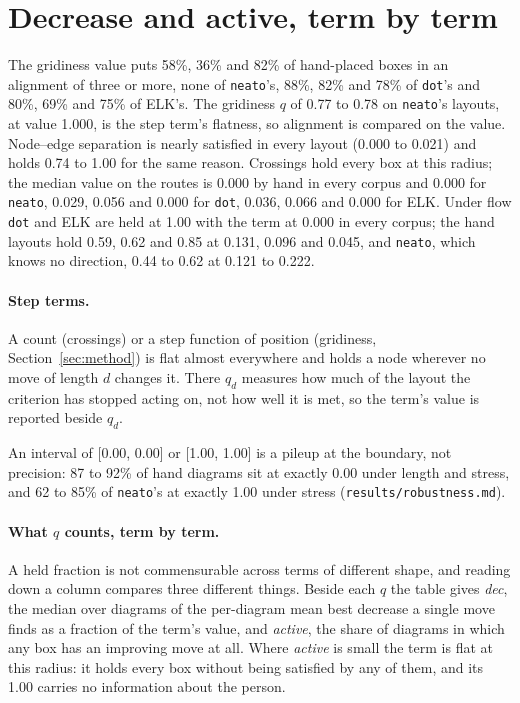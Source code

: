 \documentclass[a4paper,UKenglish]{gd-lipics-v3}
\begin{document}


\section{Decrease and active, term by term}\label{app:flat}

The gridiness value puts 58\%, 36\% and 82\% of hand-placed
boxes in an alignment of three or more, none of \texttt{neato}'s, 88\%, 82\% and 78\% of
\texttt{dot}'s and 80\%, 69\% and 75\% of ELK's. The gridiness $q$ of 0.77 to 0.78 on \texttt{neato}'s layouts, at value
1.000, is the step term's flatness, so alignment is compared on the value.
Node--edge separation is nearly satisfied in every layout (0.000 to 0.021) and holds 0.74
to 1.00 for the same reason. Crossings hold every box at this radius; the median value on
the routes is 0.000 by hand in every corpus and 0.000 for \texttt{neato}, 0.029, 0.056 and
0.000 for \texttt{dot}, 0.036, 0.066 and 0.000 for ELK. Under flow \texttt{dot} and ELK
are held at 1.00 with the term at 0.000 in every corpus; the hand layouts hold 0.59, 0.62
and 0.85 at 0.131, 0.096 and 0.045, and \texttt{neato}, which knows no direction, 0.44 to
0.62 at 0.121 to 0.222.

\paragraph{Step terms.} A count (crossings) or a step function of position (gridiness,
Section~\ref{sec:method}) is flat almost everywhere and holds a node wherever no move of
length $d$ changes it. There $q_d$ measures how much of the layout the criterion has stopped
acting on, not how well it is met, so the term's value is reported beside $q_d$.

An interval of [0.00, 0.00] or [1.00, 1.00] is a pileup at the boundary, not precision: 87 to 92\% of hand diagrams sit at exactly 0.00 under length and stress, and 62 to 85\% of \texttt{neato}'s at exactly 1.00 under stress (\texttt{results/robustness.md}).

\paragraph{What $q$ counts, term by term.} A held fraction is not commensurable across
terms of different shape, and reading down a column compares three different things. Beside
each $q$ the table gives \emph{dec}, the median over diagrams of the per-diagram mean best
decrease a single move finds as a fraction of the term's value, and \emph{active}, the share of diagrams in which
any box has an improving move at all. Where \emph{active} is small the term is flat at this
radius: it holds every box without being satisfied by any of them, and its 1.00 carries no
information about the person.
\end{document}
